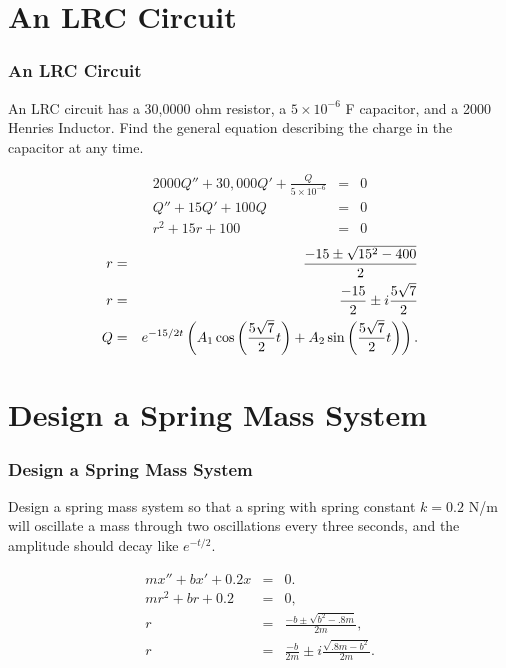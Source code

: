 \section{An LRC Circuit}

\begin{frame}
  \frametitle{An LRC Circuit}

  An LRC circuit has a 30,0000 ohm resistor, a $5\times 10^{-6}$ F
  capacitor, and a 2000 Henries Inductor. Find the general equation
  describing  the charge in the capacitor at any time.

  {
    \begin{eqnarray*}
      2000 Q'' + 30,000 Q' + \frac{Q}{5\times 10^{-6}} & = & 0 \\
      Q'' + 15 Q' + 100 Q & = & 0 \\
      r^2 + 15 r + 100 & = & 0 
    \end{eqnarray*}
    \begin{eqnarray*}
      r & = & \frac{-15\pm\sqrt{15^2-400}}{2} \\
      r & = & \frac{-15}{2} \pm i\frac{5\sqrt{7}}{2} \\
      Q & = & e^{-15/2 t} 
      \left( A_1 \cos\left( \frac{5\sqrt{7}}{2} t\right) + A_2 \sin\left( \frac{5\sqrt{7}}{2} t \right) \right).
    \end{eqnarray*}
    
  }

\end{frame}

\section{Design a Spring Mass System}

\begin{frame}
  \frametitle{Design a Spring Mass System}

  Design a spring mass system so that a spring with spring constant
  $k=0.2$ N/m will oscillate a mass through two oscillations every
  three seconds, and the amplitude should decay like $e^{-t/2}$.

  {
    \begin{eqnarray*}
      m x'' + bx' + 0.2x & = & 0. \\
      m r^2 + br + 0.2 & = & 0, \\
      r & = & \frac{-b\pm\sqrt{b^2-.8m}}{2m}, \\
      r & = & \frac{-b}{2m} \pm i \frac{\sqrt{.8m - b^2}}{2m}.
    \end{eqnarray*}
    
  }

\end{frame}


